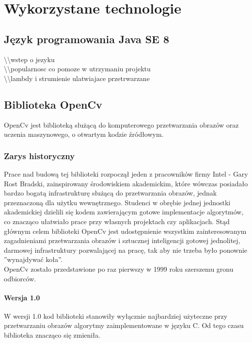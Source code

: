 \documentclass[a4paper,12pt]{article}
\begin{document}
\newpage 

\section{Wykorzystane technologie}

\subsection{Język programowania Java SE 8}
\textbackslash\textbackslash wstep o jezyku \\
\textbackslash\textbackslash popularnosc co pomoze w utrzymaniu projektu \\
\textbackslash\textbackslash lambdy i strumienie ulatwiajace przetrwarzane

\subsection{Biblioteka OpenCv}

OpenCv jest biblioteką służącą do komputerowego przetwarzania obrazów oraz uczenia maszynowego, 
o otwartym kodzie źródłowym.
\subsubsection{Zarys historyczny}
Prace nad budową tej biblioteki rozpoczął jeden z pracowników firmy Intel - Gary Rost Bradski, zainspirowany środowiskiem akademickim, które wówczas posiadało bardzo bogatą infrastrukturę służącą do przetwarzania obrazów, jednak przeznaczoną dla użytku wewnętrznego. 
Studenci w obrębie jednej jednostki akademickiej dzielili się kodem zawierającym gotowe implementacje algorytmów, co znacząco ułatwiało prace przy własnych projektach czy aplikacjach. 
Stąd głównym celem biblioteki OpenCv jest udostępnienie wszystkim zainteresowanym zagadnieniami przetwarzania obrazów i sztucznej inteligencji gotowej jednolitej, darmowej infrastruktury pozwalającej na pracę, tak aby nie trzeba było ponownie ''wynajdywać koła''.\\

OpenCv zostało przedstawione po raz pierwszy w 1999 roku szerszemu gronu odbiorców. 
\paragraph{Wersja 1.0}
W wersji 1.0 kod biblioteki stanowiły wyłącznie najbardziej użyteczne przy przetwarzaniu obrazów
algorytmy zaimplementowane w języku C. 
Od tego czasu biblioteka znacząco się zmieniła. 
\end{document}
